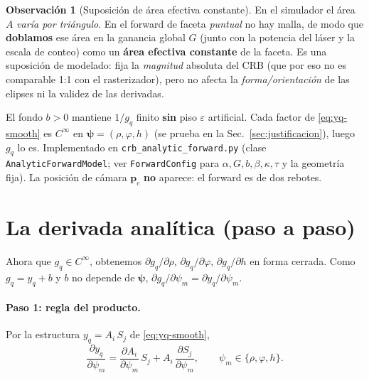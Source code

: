 \documentclass[11pt,a4paper]{article}
\theoremstyle{plain}
\theoremstyle{definition}
\newtheorem{remark}{Observaci\'on}
\newcommand{\vect}[1]{\boldsymbol{#1}}
\begin{document}
\begin{remark}[Suposici\'on de \'area efectiva constante]
\label{rem:area}
En el simulador el \'area $A$ \emph{var\'ia por tri\'angulo}. En el forward de
faceta \emph{puntual} no hay malla, de modo que \textbf{doblamos} ese \'area en la
ganancia global $G$ (junto con la potencia del l\'aser y la escala de conteo) como
un \textbf{\'area efectiva constante} de la faceta. Es una suposici\'on de
modelado: fija la \emph{magnitud} absoluta del CRB (que por eso no es comparable
1:1 con el rasterizador), pero no afecta la \emph{forma/orientaci\'on} de las
elipses ni la validez de las derivadas.
\end{remark}

El fondo $b>0$ mantiene $1/g_q$ finito \textbf{sin} piso $\varepsilon$ artificial.
Cada factor de \eqref{eq:yq-smooth} es $C^\infty$ en $\vect{\psi}=(\rho,\varphi,h)$
(se prueba en la Sec.~\ref{sec:justificacion}), luego $g_q$ lo es. Implementado en
\texttt{crb\_analytic\_forward.py} (clase \texttt{AnalyticForwardModel}; ver
\texttt{ForwardConfig} para $\alpha,G,b,\beta,\kappa,\tau$ y la geometr\'ia fija).
La posici\'on de c\'amara $\vect{p}_c$ \textbf{no} aparece: el forward es de dos
rebotes.

\section{La derivada anal\'itica (paso a paso)}
\label{sec:derivadas}

Ahora que $g_q\in C^\infty$, obtenemos $\partial g_q/\partial\rho$,
$\partial g_q/\partial\varphi$, $\partial g_q/\partial h$ en forma cerrada. Como
$g_q=y_q+b$ y $b$ no depende de $\vect{\psi}$,
$\partial g_q/\partial\psi_m=\partial y_q/\partial\psi_m$.

\paragraph{Paso 1: regla del producto.} Por la estructura $y_q=A_i\,S_j$ de
\eqref{eq:yq-smooth},
\begin{equation}
    \frac{\partial y_q}{\partial\psi_m}
    =\frac{\partial A_i}{\partial\psi_m}\,S_j
    +A_i\,\frac{\partial S_j}{\partial\psi_m},
    \qquad \psi_m\in\{\rho,\varphi,h\}.
    \label{eq:chain}
\end{equation}
\end{document}
